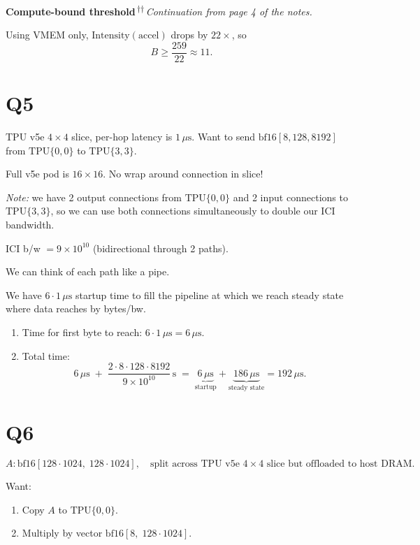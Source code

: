 \documentclass[11pt]{article}
\begin{document}
\textbf{Compute-bound threshold}\,\textsuperscript{$\dagger$}\textsuperscript{$\dagger$}\,\emph{Continuation from page 4 of the notes.}

Using VMEM only, $\text{Intensity}(\text{accel})$ drops by $22\times$, so
\[
B \geq \frac{259}{22} \approx 11.
\]

\section*{Q5}

TPU v5e $4 \times 4$ slice, per-hop latency is $1\,\mu\text{s}$. Want to send $\text{bf16}[8, 128, 8192]$ from $\text{TPU}\{0,0\}$ to $\text{TPU}\{3,3\}$.

Full v5e pod is $16 \times 16$. No wrap around connection in slice!

\emph{Note:} we have 2 output connections from $\text{TPU}\{0,0\}$ and 2 input connections to $\text{TPU}\{3,3\}$, so we can use both connections simultaneously to double our ICI bandwidth.

ICI b/w $= 9 \times 10^{10}$ (bidirectional through 2 paths).

We can think of each path like a pipe.

We have $6 \cdot 1\,\mu\text{s}$ startup time to fill the pipeline at which we reach steady state where data reaches by bytes/bw.

\begin{enumerate}[label=(\roman*)]
  \item Time for first byte to reach: $6 \cdot 1\,\mu\text{s} = 6\,\mu\text{s}$.
  \item Total time:
  \[
  6\,\mu\text{s} \;+\; \frac{2 \cdot 8 \cdot 128 \cdot 8192}{9 \times 10^{10}}\,\text{s}
  \;=\; \underbrace{6\,\mu\text{s}}_{\text{startup}} + \underbrace{186\,\mu\text{s}}_{\text{steady state}} = 192\,\mu\text{s}.
  \]
\end{enumerate}

\section*{Q6}

\[
A : \text{bf16}[128 \cdot 1024,\; 128 \cdot 1024], \quad \text{split across TPU v5e } 4 \times 4 \text{ slice but offloaded to host DRAM.}
\]

Want:
\begin{enumerate}[label=\arabic*.]
  \item Copy $A$ to $\text{TPU}\{0,0\}$.
  \item Multiply by vector $\text{bf16}[8,\; 128 \cdot 1024]$.
\end{enumerate}
\end{document}
